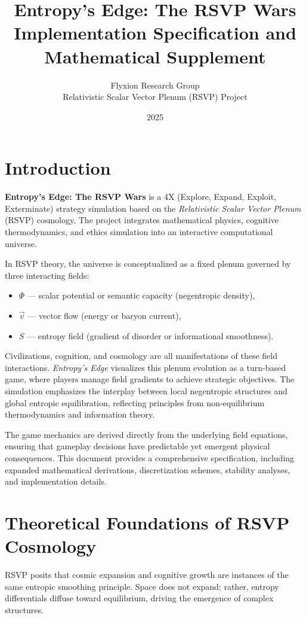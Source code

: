 \documentclass[12pt]{article}
\title{\textbf{Entropy’s Edge: The RSVP Wars}\\
\large Implementation Specification and Mathematical Supplement}
\author{Flyxion Research Group\\
Relativistic Scalar Vector Plenum (RSVP) Project}
\date{2025}
\theoremstyle{definition}
\begin{document}
\maketitle
\tableofcontents
\newpage

\section{Introduction}
\textbf{Entropy’s Edge: The RSVP Wars} is a 4X (Explore, Expand, Exploit, Exterminate) strategy simulation based on the \emph{Relativistic Scalar Vector Plenum} (RSVP) cosmology. The project integrates mathematical physics, cognitive thermodynamics, and ethics simulation into an interactive computational universe.

In RSVP theory, the universe is conceptualized as a fixed plenum governed by three interacting fields:
\begin{itemize}[nosep]
  \item $\Phi$ — scalar potential or semantic capacity (negentropic density),
  \item $\vec{v}$ — vector flow (energy or baryon current),
  \item $S$ — entropy field (gradient of disorder or informational smoothness).
\end{itemize}

Civilizations, cognition, and cosmology are all manifestations of these field interactions. \emph{Entropy’s Edge} visualizes this plenum evolution as a turn-based game, where players manage field gradients to achieve strategic objectives. The simulation emphasizes the interplay between local negentropic structures and global entropic equilibration, reflecting principles from non-equilibrium thermodynamics and information theory.

The game mechanics are derived directly from the underlying field equations, ensuring that gameplay decisions have predictable yet emergent physical consequences. This document provides a comprehensive specification, including expanded mathematical derivations, discretization schemes, stability analyses, and implementation details.

\section{Theoretical Foundations of RSVP Cosmology}
RSVP posits that cosmic expansion and cognitive growth are instances of the same entropic smoothing principle. Space does not expand; rather, entropy differentials diffuse toward equilibrium, driving the emergence of complex structures.
\end{document}
